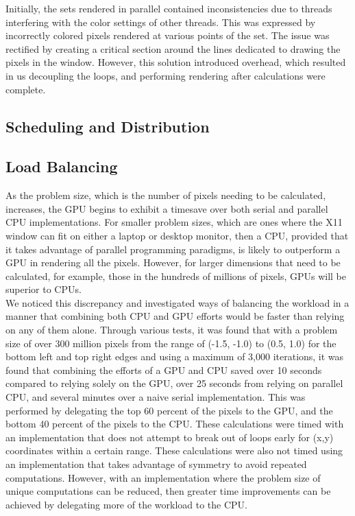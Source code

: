 \documentclass{article}
\begin{document}
Initially, the sets rendered in parallel contained inconsistencies due to threads interfering with the color settings of other threads. This was expressed by incorrectly colored pixels rendered at various points of the set. The issue was rectified by creating a critical section around the lines dedicated to drawing the pixels in the window. However, this solution introduced overhead, which resulted in us decoupling the loops, and performing rendering after calculations were complete. 



\subsection{Scheduling and Distribution}

\subsection{Load Balancing}

As the problem size, which is the number of pixels needing to be calculated, increases, the GPU begins to exhibit a timesave over both serial and parallel CPU implementations. For smaller problem sizes, which are ones where the X11 window can fit on either a laptop or desktop monitor, then a CPU, provided that it takes advantage of parallel programming paradigms, is likely to outperform a GPU in rendering all the pixels. However, for larger dimensions that need to be calculated, for example, those in the hundreds of millions of pixels, GPUs will be superior to CPUs.\\

We noticed this discrepancy and investigated ways of balancing the workload in a manner that combining both CPU and GPU efforts would be faster than relying on any of them alone. Through various tests, it was found that with a problem size of over 300 million pixels from the range of (-1.5, -1.0) to (0.5, 1.0) for the bottom left and top right edges and using a maximum of 3,000 iterations, it was found that combining the efforts of a GPU and CPU saved over 10 seconds compared to relying solely on the GPU, over 25 seconds from relying on parallel CPU, and several minutes over a naive serial implementation. This was performed by delegating the top 60 percent of the pixels to the GPU, and the bottom 40 percent of the pixels to the CPU. These calculations were timed with an implementation that does not attempt to break out of loops early for (x,y) coordinates within a certain range. These calculations were also not timed using an implementation that takes advantage of symmetry to avoid repeated computations. However, with an implementation where the problem size of unique computations can be reduced, then greater time improvements can be achieved by delegating more of the workload to the CPU.
\end{document}
